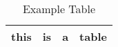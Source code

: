 

\begin{table}[!ht]
	\begin{center}
		\label{tble:example}\caption{Example Table}
		\begin{tabular}{|c | c | c | c|}
			\hline
			this & is & a & table \\ \hline
		\end{tabular}
	\end{center}
\end{table}


